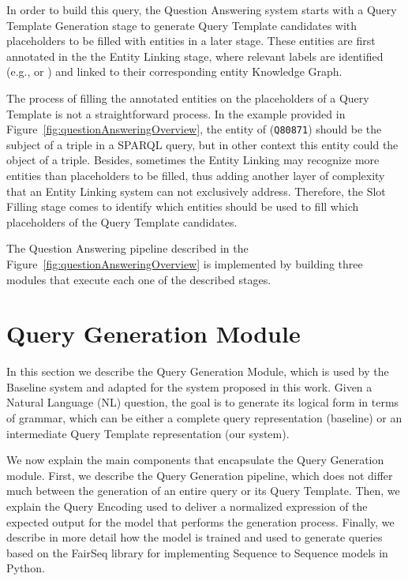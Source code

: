 In order to build this \SPARQL{} query, the Question Answering system starts with 
a Query Template Generation stage to generate \SPARQL{} Query Template candidates with 
placeholders to be filled with entities in a later stage. These entities are first annotated 
in the the Entity Linking stage, where relevant labels are identified (e.g.,  or ) and linked to their corresponding entity Knowledge Graph. 

The process of filling the annotated entities on the placeholders of a Query Template is not a 
straightforward process. In the example provided in Figure~\ref{fig:questionAnsweringOverview},
the entity of  (\texttt{Q80871}) should be the subject 
of a triple in a SPARQL query, but in other context this entity could the object of a triple. 
Besides, sometimes the Entity Linking may recognize more entities than placeholders to be filled, 
thus adding another layer of complexity that an Entity Linking system can not exclusively address.
Therefore, the Slot Filling stage comes to identify which entities should be used to 
fill which placeholders of the Query Template candidates. 

The Question Answering pipeline described in the Figure~\ref{fig:questionAnsweringOverview} 
is implemented by building three modules that execute each one of the described stages. 

\section{Query Generation Module}
\label{cap3:system/queryGenModule}
In this section we describe the Query Generation Module, which is used by the Baseline system 
and adapted for the system proposed in this work. Given a Natural Language (NL) question, the 
goal is to generate its logical form in terms of \SPARQL{} grammar, which can be either a 
complete \SPARQL{} query representation (baseline) or an intermediate Query Template 
representation (our system).

We now explain the main components that encapsulate the Query Generation module. First, we 
describe the Query Generation pipeline, which does not differ much between the generation of 
an entire \SPARQL{} query or its Query Template. Then, we explain the Query Encoding used to 
deliver a normalized expression of the expected output for the model that performs the 
generation process. Finally, we describe in more detail how the model is trained and used to 
generate queries based on the FairSeq library for implementing Sequence to Sequence models in 
Python.

